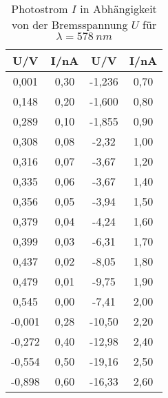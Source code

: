 \begin{table}[h!]
  \centering
  \caption{Photostrom $I$ in Abhängigkeit von der Bremsspannung $U$ für $\lambda=\SI{578}{nm}$}
  \label{tab:messreihe2}
  \begin{tabular}{c c c c}
    \toprule
      U/V & I/nA  & U/V & I/nA\\
    \midrule
     0,001 & 0,30 & -1,236 & 0,70 \\
     0,148 & 0,20 & -1,600 & 0,80 \\
     0,289 & 0,10 & -1,855 & 0,90 \\
     0,308 & 0,08 & -2,32  & 1,00 \\
     0,316 & 0,07 & -3,67  & 1,20 \\
     0,335 & 0,06 & -3,67  & 1,40 \\
     0,356 & 0,05 & -3,94  & 1,50 \\
     0,379 & 0,04 & -4,24  & 1,60 \\
     0,399 & 0,03 & -6,31  & 1,70 \\
     0,437 & 0,02 & -8,05  & 1,80 \\
     0,479 & 0,01 & -9,75  & 1,90 \\
     0,545 & 0,00 & -7,41  & 2,00 \\
    -0,001 & 0,28 & -10,50 & 2,20 \\
    -0,272 & 0,40 & -12,98 & 2,40 \\
    -0,554 & 0,50 & -19,16 & 2,50 \\
    -0,898 & 0,60 & -16,33 & 2,60 \\

    \bottomrule
  \end{tabular}
\end{table}
